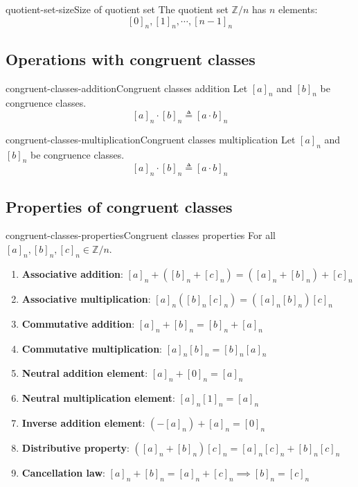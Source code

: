 \documentclass[preview]{standalone}
\begin{document}
\begin{snippetproposition}{quotient-set-size}{Size of quotient set}
    The quotient set \(\mathbb{Z} / n\) has \(n\) elements:
    \[
        {[0]}_n,{[1]}_n,\cdots,{[n-1]}_n
    \]
\end{snippetproposition}

\subsection{Operations with congruent classes}

\begin{snippetdefinition}{congruent-classes-addition}{Congruent classes addition}
    Let \({[a]}_n\) and \({[b]}_n\) be congruence classes.  
    \[{[a]}_n \cdot {[b]}_n \triangleq {[a \cdot b]}_n\]
\end{snippetdefinition}

\begin{snippetdefinition}{congruent-classes-multiplication}{Congruent classes multiplication}
    Let \({[a]}_n\) and \({[b]}_n\) be congruence classes.  
    \[{[a]}_n \cdot {[b]}_n \triangleq {[a \cdot b]}_n\]
\end{snippetdefinition}

\subsection{Properties of congruent classes}

\begin{snippetproposition}{congruent-classes-properties}{Congruent classes properties}    
    For all \({[a]}_n, {[b]}_n, {[c]}_n \in \mathbb{Z}/n\).

    \begin{enumerate}
        \item \textbf{Associative addition}: \({[a]}_n + ({[b]}_n + {[c]}_n) = ({[a]}_n + {[b]}_n) + {[c]}_n\)
        \item \textbf{Associative multiplication}: \({[a]}_n ({[b]}_n {[c]}_n) = ({[a]}_n {[b]}_n) {[c]}_n\)
        \item \textbf{Commutative addition}: \({[a]}_n + {[b]}_n = {[b]}_n + {[a]}_n\)
        \item \textbf{Commutative multiplication}: \({[a]}_n {[b]}_n = {[b]}_n {[a]}_n\)
        \item \textbf{Neutral addition element}: \({[a]}_n + {[0]}_n = {[a]}_n\)
        \item \textbf{Neutral multiplication element}: \({[a]}_n {[1]}_n = {[a]}_n\)
        \item \textbf{Inverse addition element}: \((-{[a]}_n) + {[a]}_n = {[0]}_n\)
        \item \textbf{Distributive property}: \(({[a]}_n + {[b]}_n) {[c]}_n = {[a]}_n{[c]}_n + {[b]}_n{[c]}_n\)
        \item \textbf{Cancellation law}: \({[a]}_n + {[b]}_n = {[a]}_n + {[c]}_n \implies {[b]}_n = {[c]}_n\)
    \end{enumerate}
\end{snippetproposition}
\end{document}
